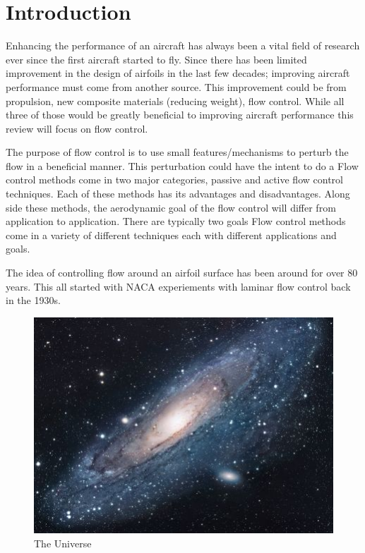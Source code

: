 
\section{Introduction}
\setcounter{page}{1}
Enhancing the performance of an aircraft has always been a vital field of research ever since the first aircraft started to fly.
Since there has been limited improvement in the design of airfoils in the last few decades; improving aircraft performance must come from another source.
This improvement could be from propulsion, new composite materials (reducing weight), flow control.
While all three of those would be greatly beneficial to improving aircraft performance this review will focus on flow control.

The purpose of flow control is to use small features/mechanisms to perturb the flow in a beneficial manner.
This perturbation could have the intent to do a 
Flow control methods come in two major categories, passive and active flow control techniques.
Each of these methods has its advantages and disadvantages.
Along side these methods, the aerodynamic goal of the flow control will differ from application to application.
There are typically two goals
Flow control methods come in a variety of different techniques each with different applications and goals.

The idea of controlling flow around an airfoil surface has been around for over 80 years.
This all started with NACA experiements with laminar flow control back in the 1930s.

\begin{figure}[h!]
\centering
\includegraphics[scale=1.7]{universe}
\caption{The Universe}
\label{fig:universe}
\end{figure}